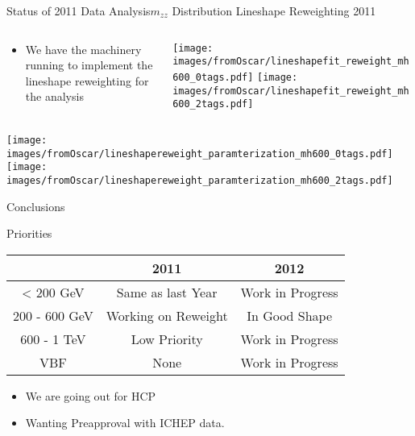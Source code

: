 \documentclass{beamer}
\begin{document}
\begin{frame}{Status of 2011 Data Analysis}{$m_{zz}$ Distribution Lineshape Reweighting 2011}
  \begin{columns}
    \begin{column}{0.4\textwidth}
      \scriptsize
  \begin{itemize}
  \item
    We have the machinery running to implement the lineshape reweighting for the analysis
  \end{itemize}
\end{column}
    
    \begin{column}{0.55\textwidth}
  \texttt{[image: images/fromOscar/lineshapefit\_reweight\_mh600\_0tags.pdf]}
  \texttt{[image: images/fromOscar/lineshapefit\_reweight\_mh600\_2tags.pdf]}
 \end{column}
  \end{columns}

  \begin{center}

  \texttt{[image: images/fromOscar/lineshapereweight\_paramterization\_mh600\_0tags.pdf]}
  \texttt{[image: images/fromOscar/lineshapereweight\_paramterization\_mh600\_2tags.pdf]}

  \end{center}
\end{frame}


\begin{frame}{Conclusions}
  \begin{center}
  
  Priorities
\\
\vspace{1em}
\begin{tabular}{ |c|c|c|}
  \hline
              & 2011 & 2012 \\ \hline \hline
< 200 GeV     &  Same as last Year & Work in Progress \\ \hline
200 - 600 GeV &  Working on Reweight  & In Good Shape \\ \hline
600 - 1 TeV   &  Low Priority & Work in Progress \\ \hline
VBF           & None & Work in Progress \\ \hline

\end{tabular}
\end{center}
\vspace{2em}
\begin{itemize}
  \item
    We are going out for HCP
  \item
    Wanting Preapproval with ICHEP data.
  \end{itemize}

\end{frame}
\end{document}
